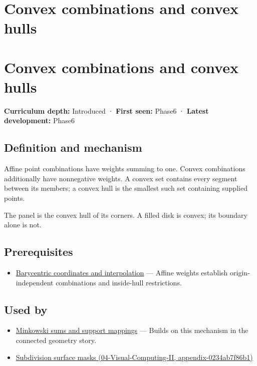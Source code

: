 \hypertarget{appendix-0026ec42c9d5}{}
\section*{Convex combinations and convex hulls}
\section{Convex combinations and convex hulls}\label{appendix-0026ec42c9d5-convex-combinations-and-convex-hulls}

\textbf{Curriculum depth:} Introduced · \textbf{First seen:} Phase6 · \textbf{Latest development:} Phase6

\subsection{Definition and mechanism}\label{appendix-0026ec42c9d5-definition-and-mechanism}

Affine point combinations have weights summing to one. Convex combinations additionally have nonnegative weights. A convex set contains every segment between its members; a convex hull is the smallest such set containing supplied points.

The panel is the convex hull of its corners. A filled disk is convex; its boundary alone is not.

\subsection{Prerequisites}\label{appendix-0026ec42c9d5-prerequisites}

\begin{itemize}
\tightlist
\item
  \hyperref[appendix-02b9d9a81dca]{Barycentric coordinates and interpolation} --- Affine weights establish origin-independent combinations and inside-hull restrictions.
\end{itemize}

\subsection{Used by}\label{appendix-0026ec42c9d5-used-by}

\begin{itemize}
\tightlist
\item
  \hyperref[appendix-215ac7099a82]{Minkowski sums and support mappings} --- Builds on this mechanism in the connected geometry story.
\item
  \href{../04-Visual-Computing-II/main.pdf\#nameddest=appendix-0234ab7f86b1}{Subdivision surface masks (04-Visual-Computing-II, appendix-0234ab7f86b1)}
\end{itemize}

